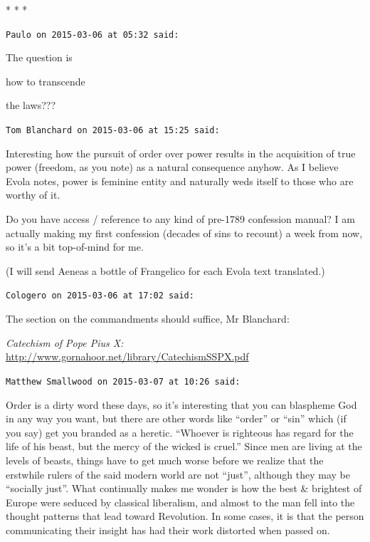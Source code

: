 
\begin{center}* * *\end{center}

\begin{footnotesize}
\begin{sffamily}
\texttt{Paulo on 2015-03-06 at 05:32 said:}

The question is

how to transcende

the laws???

\hfill

\texttt{Tom Blanchard on 2015-03-06 at 15:25 said:}

Interesting how the pursuit of order over power results in the acquisition of true power (freedom, as you note) as a natural consequence anyhow. As I believe Evola notes, power is feminine entity and naturally weds itself to those who are worthy of it.

Do you have access / reference to any kind of pre-1789 confession manual? I am actually making my first confession (decades of sins to recount) a week from now, so it's a bit top-of-mind for me.

(I will send Aeneas a bottle of Frangelico for each Evola text translated.)

\hfill

\texttt{Cologero on 2015-03-06 at 17:02 said:}

The section on the commandments should suffice, Mr Blanchard:

\textit{Catechism of Pope Pius X:} \url{http://www.gornahoor.net/library/CatechismSSPX.pdf}

\hfill

\texttt{Matthew Smallwood on 2015-03-07 at 10:26 said:}

Order is a dirty word these days, so it's interesting that you can blaspheme God in any way you want, but there are other words like ``order'' or ``sin'' which (if you say) get you branded as a heretic. ``Whoever is righteous has regard for the life of his beast, but the mercy of the wicked is cruel.'' Since men are living at the levels of beasts, things have to get much worse before we realize that the erstwhile rulers of the said modern world are not ``just'', although they may be ``socially just''. What continually makes me wonder is how the best \& brightest of Europe were seduced by classical liberalism, and almost to the man fell into the thought patterns that lead toward Revolution. In some cases, it is that the person communicating their insight has had their work distorted when passed on.


\end{sffamily}
\end{footnotesize}
